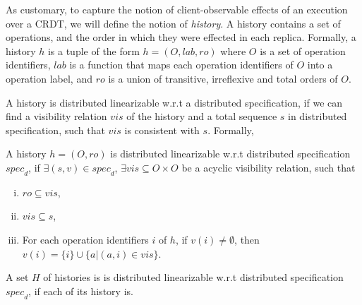 As customary, to capture the notion of client-observable effects of an execution over a CRDT, we will define the notion of \emph{history}. A history contains a set of operations, and the order in which they were effected in each replica. Formally, a history $h$ is a tuple of the form $h = (O,\mathit{lab},\mathit{ro})$ where $O$ is a set of operation identifiers, $\mathit{lab}$ is a function that maps each operation identifiers of $O$ into a operation label, and $\mathit{ro}$ is a union of transitive, irreflexive and total orders of $O$.

A history is distributed linearizable w.r.t a distributed specification, if we can find a visibility relation $\mathit{vis}$ of the history and a total sequence $s$ in distributed specification, such that $\mathit{vis}$ is consistent with $s$. Formally,

\begin{definition}
\label{definition:distributed linearizability}
A history $h = (O,\mathit{ro})$ is distributed linearizable w.r.t distributed specification $\mathit{spec}_d$, if $\exists (s,v) \in \mathit{spec}_d$, $\exists \mathit{vis} \subseteq O \times O$ be a acyclic visibility relation, such that

\begin{enumerate}[(i)]
\item $\mathit{ro} \subseteq \mathit{vis}$,
\item $\mathit{vis} \subseteq s$,
\item For each operation identifiers $i$ of $h$, if $v(i) \neq \emptyset$, then $v(i) = \{ i \} \cup \{ a \vert (a,i) \in \mathit{vis} \}$.
\end{enumerate}

A set $H$ of histories is is distributed linearizable w.r.t distributed specification $\mathit{spec}_d$, if each of its history is.
\end{definition}




